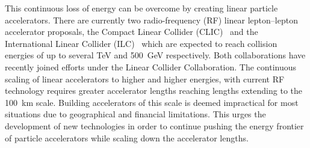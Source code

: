 This continuous loss of energy can be overcome by creating linear particle
accelerators. There are currently two radio-frequency (RF) linear lepton--lepton
accelerator proposals, the Compact Linear Collider (CLIC)~\cite{Linssen2012hp}
and the International Linear Collider (ILC)~\cite{Behnke2013xla} which are
expected to reach collision energies of up to several \si{\tera\electronvolt}
and \SI{500}{\giga\electronvolt} respectively. Both collaborations have recently
joined efforts under the Linear Collider Collaboration. The continuous scaling
of linear accelerators to higher and higher energies, with current RF technology
requires greater accelerator lengths reaching lengths extending to the
\SI{100}{\kilo\meter} scale. Building accelerators of this scale is deemed
impractical for most situations due to geographical and financial limitations.
This urges the development of new technologies in order to continue pushing the
energy frontier of particle accelerators while scaling down the accelerator
lengths.



